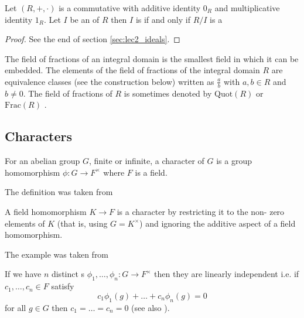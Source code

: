 \begin{appendices}
\begin{theorem}
  Let $\left(R, +, \cdot\right)$ is a commutative 
  with additive identity $0_R$ and multiplicative identity $1_R$. Let
  $I$ be an  of $R$ then $I$ is
   if and only if 
  $R/I$ is a 
  \begin{proof}
    See the end of section \ref{sec:lec2_ideals}.
  \end{proof}
  \label{thm:maxideal}
\end{theorem}

\begin{definition}
  The field of fractions of an integral domain is the smallest field
  in which it can be embedded. The elements of the field of fractions
  of the integral domain $R$ are equivalence classes
  (see the construction below) written as $\frac{a}{b}$ with $a, b \in
  R$ and $b\neq 0$. The field of
  fractions of $R$ is sometimes denoted by
  $\mathrm{Quot} (R)$ or $\mathrm {Frac}(R)$ \cite{wiki:fractionfield}. 
  \label{def:fractionfield}
\end{definition}

\subsection{Characters}

\begin{definition}[Character]
  For an abelian group $G$, finite or infinite, a character of $G$ is
  a group homomorphism $\phi: G \to F^\times$ where $F$ is a field.

  The definition was taken from \cite{bib:KeithConradLinearchar}
  \label{def:character}
\end{definition}

\begin{example}[Character]
  A field homomorphism $K \to F$ is a character by restricting it to the
  non- zero elements of $K$ (that is, using $G = K^\times$) and ignoring the
  additive aspect of a field homomorphism.  

  The example was taken from \cite{bib:KeithConradLinearchar}
  \label{ex:character}
\end{example}

\begin{theorem}[Dedekind]
  If we have $n$ distinct s $\phi_1, \dots,
  \phi_n: G \to F^\times$ then they are linearly independent i.e. if
  $c_1, \dots, c_n \in F$ satisfy
  \[
  c_1 \phi_1(g) + \dots + c_n \phi_n(g) = 0
  \]
  for all $g \in G$ then $c_1 = \dots = c_n = 0$
  (see also \cite{bib:KeithConradLinearchar}).
  \label{thm:dedekind}
\end{theorem}


\end{appendices}
